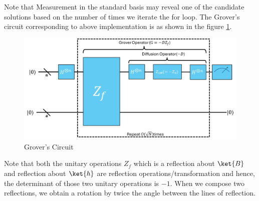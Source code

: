\documentclass[12pt, oneside]{book}
\theoremstyle{definition}
\theoremstyle{definition}
\theoremstyle{remark}
\begin{document}
Note that Measurement in the standard basis may reveal one of the candidate solutions based on the number of times we iterate the for loop. The Grover's circuit corresponding to above implementation is as shown in the figure \ref{fig:grover_circuit}.
\begin{figure}[H]
    \centering
    \includegraphics[width=0.9\linewidth]{../images/grovercircuit.png}
    \caption{Grover's Circuit}
    \label{fig:grover_circuit}
\end{figure}
Note that both the unitary operations $Z_f$ which is a reflection about $\ket{B}$ and reflection about $\ket{h}$ are reflection operations/transformation and hence, the determinant of those two unitary operations is $-1$. When we compose two reflections, we obtain a rotation by twice the angle between the lines of reflection. 
\end{document}
